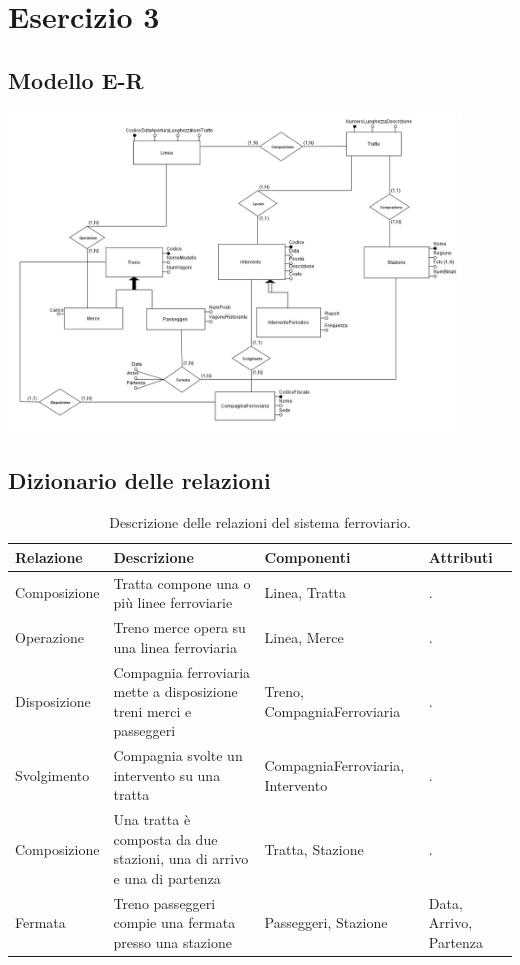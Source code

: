 \documentclass{article}
\begin{document}
\pagestyle{empty}

\section*{Esercizio 3} 

\subsection*{Modello E-R}
\includegraphics*[width=0.9\textwidth]{foto1.png}

\subsection*{Dizionario delle relazioni}
\begin{table}[ht]
    \centering
    \begin{tabularx}{\textwidth}{|X|X|X|X|}
        \hline
        Relazione & Descrizione & Componenti & Attributi \\
        \hline
        Composizione & Tratta compone una o più linee ferroviarie & Linea, Tratta & . \\
        \hline
        Operazione & Treno merce opera su una linea ferroviaria & Linea, Merce & . \\
        \hline
        Disposizione & Compagnia ferroviaria mette a disposizione treni merci e passeggeri & Treno, CompagniaFerroviaria & . \\
        \hline
        Svolgimento & Compagnia svolte un intervento su una tratta & CompagniaFerroviaria, Intervento & . \\
        \hline
        Composizione & Una tratta è composta da due stazioni, una di arrivo e una di partenza & Tratta, Stazione & . \\
        \hline
        Fermata & Treno passeggeri compie una fermata presso una stazione & Passeggeri, Stazione & Data, Arrivo, Partenza \\
        \hline
        
    \end{tabularx}
    \caption{Descrizione delle relazioni del sistema ferroviario.}
\end{table}
\end{document}
